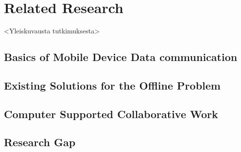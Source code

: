 
\chapter{Related Research}

<Yleiskuvausta tutkimuksesta>



\section{Basics of Mobile Device Data communication}

\section{Existing Solutions for the Offline Problem}

\section{Computer Supported Collaborative Work}


\section{Research Gap}
